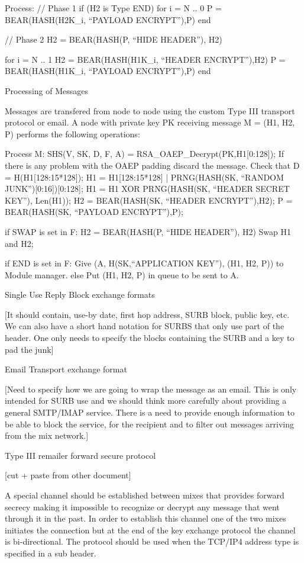 Process:
	// Phase 1
	if (H2 is Type END)
		for i = N .. 0
			P = BEAR(HASH(H2K_i, ``PAYLOAD ENCRYPT''),P)
		end

	// Phase 2
	H2 = BEAR(HASH(P, ``HIDE HEADER''), H2)

	for i = N .. 1
		H2 = BEAR(HASH(H1K_i, ``HEADER ENCRYPT''),H2)
		P = BEAR(HASH(H1K_i, ``PAYLOAD ENCRYPT''),P)
	end

Processing of Messages

Messages are transfered from node to node using the custom Type III
transport protocol or email. A node with private key PK receiving
message M = (H1, H2, P) performs the following operations:

Process M:
	SHS(V, SK, D, F, A) = RSA_OAEP_Decrypt(PK,H1[0:128]);
	If there is any problem with the OAEP padding discard the message.
	Check that D = H(H1[128:15*128]);
	H1 = H1[128:15*128] | PRNG(HASH(SK, ``RANDOM
						JUNK'')[0:16])[0:128];
	H1 = H1 XOR PRNG(HASH(SK, ``HEADER SECRET KEY''), Len(H1));
	H2 = BEAR(HASH(SK, ``HEADER ENCRYPT''),H2);
	P = BEAR(HASH(SK, ``PAYLOAD ENCRYPT''),P);

	if SWAP is set in F:
		H2 = BEAR(HASH(P, ``HIDE HEADER''), H2)
		Swap H1 and H2;

	if END is set in F:
		Give (A, H(SK,``APPLICATION KEY''), (H1, H2, P)) to
		Module manager. 
	else
	   	Put (H1, H2, P) in queue to be sent to A.

Single Use Reply Block exchange formats

[It should contain, use-by date, first hop address, 
 SURB block, public key, etc.
 We can also have a short hand notation for SURBS that only
 use part of the header. One only needs to specify the 
 blocks containing the SURB and a key to pad the junk]

Email Transport exchange format

[Need to specify how we are going to wrap the message
 as an email. This is only intended for SURB use and
 we should think more carefully about providing a 
 general SMTP/IMAP service.
 There is a need to provide enough information to be 
 able to block the service, for the recipient and to
 filter out messages arriving from the mix network.]

Type III remailer forward secure protocol

[cut + paste from other document]

A special channel should be established between mixes that provides
forward secrecy making it impossible to recognize or decrypt any
message that went through it in the past. In order to establish this
channel one of the two mixes initiates the connection but at the end
of the key exchange protocol the channel is bi-directional. The
protocol should be used when the TCP/IP4 address type is specified in
a sub header.

